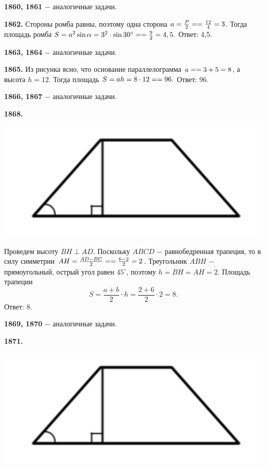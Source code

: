 \textbf{1860, 1861} $-$ аналогичные задачи.

\textbf{1862.} Стороны ромба равны, поэтому одна сторона $a = \frac{P}{2} = \linebreak = \frac{12}{4} = 3$. Тогда площадь ромба $S = a^2\sin{\alpha} = 3^2\cdot\sin{30^\circ} = \linebreak = \frac{9}{2} = 4,5.$ \newline \null \hspace*{\fill} Ответ: 4,5.

\textbf{1863, 1864} $-$ аналогичные задачи.

\textbf{1865.} Из рисунка ясно, что основание параллелограмма $a = \linebreak = 3+ 5 = 8$, а высота $h = 12$. Тогда площадь $S = ah = 8\cdot12=\linebreak=96.$ \newline \null \hspace*{\fill} Ответ: 96.

\textbf{1866, 1867} $-$ аналогичные задачи.

\textbf{1868.}

{\centering \includegraphics[width=0.5\linewidth]{Geometry/Content/20.png}
	
}

Проведем  высоту $BH \perp AD$.  Поскольку $ABCD$ $-$ равнобедренная трапеция, то в силу симметрии $AH = \frac{AD - BC}{2} = \linebreak = \frac{6 - 2}{2} = 2$. Треугольник $ABH$ $-$ прямоугольный, острый угол равен $45^\circ$, поэтому $h =BH = AH = 2$. Площадь трапеции
\[
S = \frac{a + b}{2}\cdot h=\frac{2 + 6}{2}\cdot 2 = 8.
\]\null \hspace*{\fill} Ответ: 8.

\textbf{1869, 1870} $-$ аналогичные задачи. 

\clearpage

\textbf{1871.}

{\centering \includegraphics[width=0.5\linewidth]{Geometry/Content/20.png}
	
}

